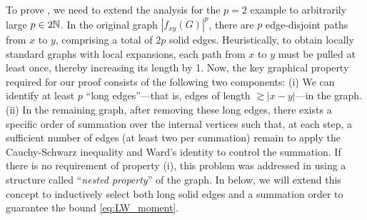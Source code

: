 To prove , we need to extend the analysis for the $p=2$ example to arbitrarily large $p\in 2\mathbb{N}$. In the original graph $|f_{xy}(G)|^p$, there are $p$ edge-disjoint paths from $x$ to $y$, comprising a total of $2p$ solid edges. Heuristically, to obtain locally standard graphs with local expansions, each path from $x$ to $y$ must be pulled at least once, thereby increasing its length by 1. 
Now, the key graphical property required for our proof consists of the following two components: (i) We can identify at least $p$ ``long edges''---that is, edges of length $\gtrsim |x-y|$---in the graph. (ii) In the remaining graph, after removing these long edges, there exists a specific order of summation over the internal vertices such that, at each step, a sufficient number of edges (at least two per summation) remain to apply the Cauchy-Schwarz inequality and Ward's identity to control the summation. 
If there is no requirement of property (i), this problem was addressed in  \cite{yang2021random} using a structure called  ``\emph{nested property}'' of the graph. 
In  below, we will extend this concept to inductively select both long solid edges and a summation order to guarantee the bound  \eqref{eq:LW_moment}.






